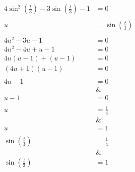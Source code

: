 \documentclass[12pt]{article}
\theoremstyle{definition}
\begin{document}
\begin{align}
    4\sin^2\left(\frac{t}{3}\right) - 3\sin\left(\frac{t}{3}\right) - 1 & = 0                            \\
    \nonumber                                                                                            \\
    u                                                                   & = \sin\left(\frac{t}{3}\right) \\
    \nonumber                                                                                            \\
    4u^2 - 3u - 1                                                       & = 0                            \\
    4u^2 - 4u + u - 1                                                   & = 0                            \\
    4u(u-1) + (u-1)                                                     & = 0                            \\
    (4u+1)(u-1)                                                         & = 0                            \\
    \nonumber                                                                                            \\
    4u-1                                                                & =0                             \\
    \nonumber                                                           & \&                             \\
    u-1                                                                 & = 0                            \\
    \nonumber                                                                                            \\
    u                                                                   & = \frac{1}{4}                  \\
    \nonumber                                                           & \&                             \\
    u                                                                   & = 1                            \\
    \nonumber                                                                                            \\
    \sin\left(\frac{t}{3}\right)                                        & = \frac{1}{4}                  \\
    \nonumber                                                           & \&                             \\
    \sin\left(\frac{t}{3}\right)                                        & = 1
\end{align}
\end{document}
